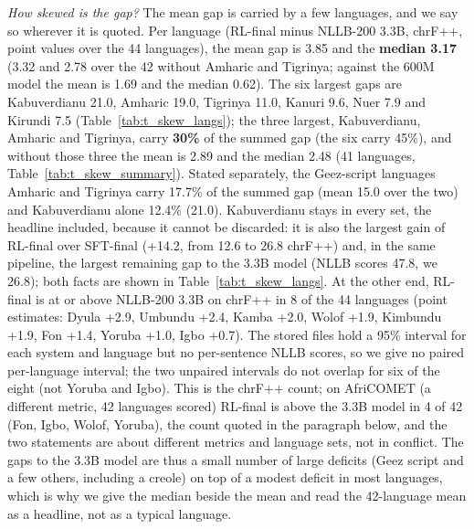 \emph{How skewed is the gap?} The mean gap is carried by a few languages, and we say so wherever it is quoted. Per language (RL-final minus NLLB-200 3.3B, chrF++, point values over the 44 languages), the mean gap is 3.85 and the \textbf{median 3.17} (3.32 and 2.78 over the 42 without Amharic and Tigrinya; against the 600M model the mean is 1.69 and the median 0.62). The six largest gaps are Kabuverdianu 21.0, Amharic 19.0, Tigrinya 11.0, Kanuri 9.6, Nuer 7.9 and Kirundi 7.5 (Table~\ref{tab:t_skew_langs}); the three largest, Kabuverdianu, Amharic and Tigrinya, carry \textbf{30\%} of the summed gap (the six carry 45\%), and without those three the mean is 2.89 and the median 2.48 (41 languages, Table~\ref{tab:t_skew_summary}). Stated separately, the Ge\textquotesingle ez-script languages Amharic and Tigrinya carry 17.7\% of the summed gap (mean 15.0 over the two) and Kabuverdianu alone 12.4\% (21.0). Kabuverdianu stays in every set, the headline included, because it cannot be discarded: it is also the largest gain of RL-final over SFT-final (+14.2, from 12.6 to 26.8 chrF++) and, in the same pipeline, the largest remaining gap to the 3.3B model (NLLB scores 47.8, we 26.8); both facts are shown in Table~\ref{tab:t_skew_langs}. At the other end, RL-final is at or above NLLB-200 3.3B on chrF++ in 8 of the 44 languages (point estimates: Dyula +2.9, Umbundu +2.4, Kamba +2.0, Wolof +1.9, Kimbundu +1.9, Fon +1.4, Yoruba +1.0, Igbo +0.7). The stored files hold a 95\% interval for each system and language but no per-sentence NLLB scores, so we give no paired per-language interval; the two unpaired intervals do not overlap for six of the eight (not Yoruba and Igbo). This is the chrF++ count; on AfriCOMET (a different metric, 42 languages scored) RL-final is above the 3.3B model in 4 of 42 (Fon, Igbo, Wolof, Yoruba), the count quoted in the paragraph below, and the two statements are about different metrics and language sets, not in conflict. The gaps to the 3.3B model are thus a small number of large deficits (Ge\textquotesingle ez script and a few others, including a creole) on top of a modest deficit in most languages, which is why we give the median beside the mean and read the 42-language mean as a headline, not as a typical language.

